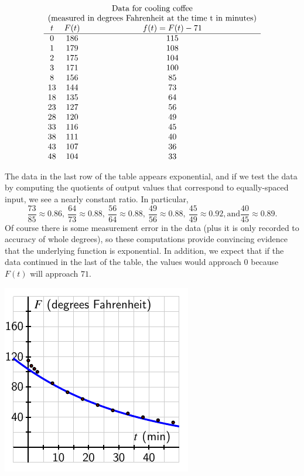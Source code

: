 \documentclass[nooutcomes]{ximera}
\begin{document}
\[
\begin{array}{ccc}
\multicolumn{3}{c}{\text{Data for cooling coffee}}\\
\multicolumn{3}{c}{\text{(measured in degrees Fahrenheit at the time t in minutes)}}\\
t&F(t)&f(t)=F(t)-71\\
\hline
0&186&115\\
1&179&108\\
2&175&104\\
3&171&100\\
8&156&85\\
13&144&73\\
18&135&64\\
23&127&56\\
28&120&49\\
33&116&45\\
38&111&40\\
43&107&36\\
48&104&33
\end{array}
\]

The data in the last row of the table appears exponential, and if we test the data by computing the quotients of output values that correspond to equally-spaced input, we see a nearly constant ratio.  In particular,%
\begin{equation*}
\frac{73}{85} \approx 0.86, \ \frac{64}{73} \approx 0.88, \ \frac{56}{64} \approx 0.88, \ \frac{49}{56} \approx 0.88, \ \frac{45}{49} \approx 0.92, \text{and} \frac{40}{45} \approx 0.89 \text{.}
\end{equation*}
Of course there is some measurement error in the data (plus it is only recorded to accuracy of whole degrees), so these computations provide convincing evidence that the underlying function is exponential.  In addition, we expect that if the data continued in the last of the table, the values would approach \(0\) because \(F(t)\) will approach \(71\).

\begin{image}
\includegraphics{modeling-coffee-shifted}
\end{image}
\end{document}
